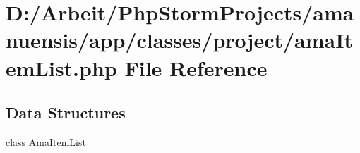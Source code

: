 \hypertarget{ama_item_list_8php}{}\section{D\+:/\+Arbeit/\+Php\+Storm\+Projects/amanuensis/app/classes/project/ama\+Item\+List.php File Reference}
\label{ama_item_list_8php}
\subsection*{Data Structures}
\begin{DoxyCompactItemize}
\item 
class \hyperlink{class_ama_item_list}{Ama\+Item\+List}
\end{DoxyCompactItemize}
